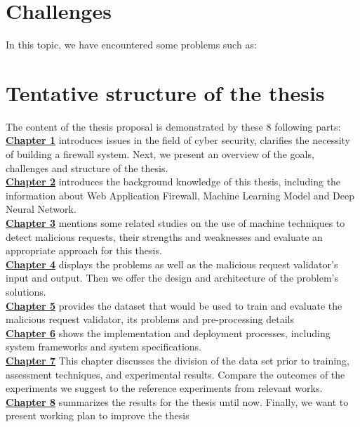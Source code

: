 \section{Challenges}
\label{sec:challenges}
In this topic, we have encountered some problems such as:
\section{Tentative structure of the thesis}
\label{sec:structure}
	\newcommand\nextintro{\\[4mm]}
	The content of the thesis proposal is demonstrated by these 8 following parts: \nextintro
	\hyperref[chap:introduction]{\textbf{Chapter 1}} introduces issues in the field of cyber security, clarifies the necessity of building a firewall system. Next, we present an overview of the goals, challenges and structure of the thesis.\nextintro
	\hyperref[chap:backgrounds]{\textbf{Chapter 2}} introduces the background knowledge of this thesis, including the information about Web Application Firewall, Machine Learning Model and Deep Neural Network.\nextintro
	\hyperref[chap:literaturereview]{\textbf{Chapter 3}} mentions some related studies on the use of machine techniques to detect malicious requests, their strengths and weaknesses and evaluate an appropriate approach for this thesis.\nextintro
	\hyperref[chap:phuong_an_de_xuat]{\textbf{Chapter 4}} displays the problems as well as the malicious request validator's input and output. Then we offer the design and architecture of the problem's solutions.\nextintro
	\hyperref[chap:tap_du_lieu]{\textbf{Chapter 5}} provides the dataset that would be used to train and evaluate the malicious request validator, its problems and pre-processing details\nextintro
	\hyperref[chap:hien_thuc_he_thong]{\textbf{Chapter 6}} shows the implementation and deployment processes, including system frameworks and system specifications.\nextintro
	\hyperref[chap:thi_nghiem_va_danh_gia]{\textbf{Chapter 7}} This chapter discusses the division of the data set prior to training, assessment techniques, and experimental results. Compare the outcomes of the experiments we suggest to the reference experiments from relevant works.\nextintro
	\hyperref[chap:tong_ket]{\textbf{Chapter 8}} summarizes the results for the thesis until now. Finally, we want to present working plan to improve the thesis\nextintro
